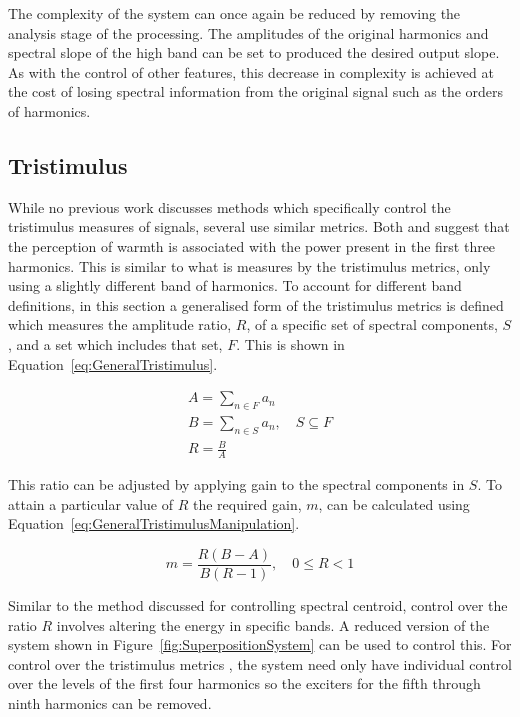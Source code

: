 		The complexity of the system can once again be reduced by removing the analysis stage of the processing.
		The amplitudes of the original harmonics and spectral slope of the high band can be set to produced the
		desired output slope. As with the control of other features, this decrease in complexity is achieved at the
		cost of losing spectral information from the original signal such as the orders of harmonics.

	\subsection{Tristimulus}
	\label{sec:FeatureControl-Parameterisation-Tristimulus}
		While no previous work discusses methods which specifically control the tristimulus measures of signals,
		several use similar metrics. Both \cite{williams2010perceptually} and \cite{zacharakis2011an} suggest that
		the perception of warmth is associated with the power present in the first three harmonics. This is similar
		to what is measures by the tristimulus metrics, only using a slightly different band of harmonics. To
		account for different band definitions, in this section a generalised form of the tristimulus metrics is
		defined which measures the amplitude ratio, $R$, of a specific set of spectral components, $S$, and a set
		which includes that set, $F$. This is shown in Equation~\ref{eq:GeneralTristimulus}.

		\begin{gather}
			A = \sum_{n \in F} a_{n} \nonumber \\
			B = \sum_{n \in S} a_{n}, \quad S \subseteq F \nonumber \\
			R = \frac{B}{A}
			\label{eq:GeneralTristimulus}
		\end{gather}

		This ratio can be adjusted by applying gain to the spectral components in $S$. To attain a particular value
		of $R$ the required gain, $m$, can be calculated using Equation~\ref{eq:GeneralTristimulusManipulation}.

		\begin{equation}
			m = \frac{R(B - A)}{B(R - 1)}, \quad 0 \leq R < 1
			\label{eq:GeneralTristimulusManipulation}
		\end{equation}

		Similar to the method discussed for controlling spectral centroid, control over the ratio $R$ involves
		altering the energy in specific bands. A reduced version of the system shown in
		Figure~\ref{fig:SuperpositionSystem} can be used to control this. For control over the tristimulus metrics
		, the system need only have individual control over the levels of the first four harmonics so the exciters
		for the fifth through ninth harmonics can be removed.

